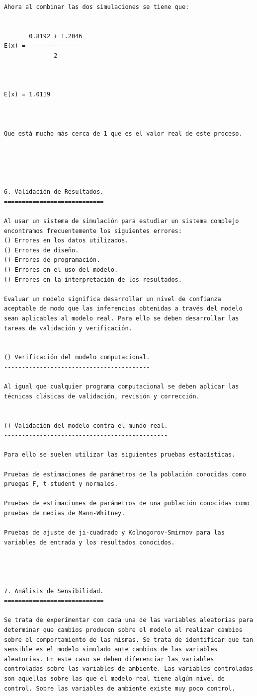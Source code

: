 \begin{verbatim}
Ahora al combinar las dos simulaciones se tiene que:


       0.8192 + 1.2046
E(x) = ---------------
              2



E(x) = 1.0119



Que está mucho más cerca de 1 que es el valor real de este proceso.





6. Validación de Resultados.
============================

Al usar un sistema de simulación para estudiar un sistema complejo encontramos frecuentemente los siguientes errores:
() Errores en los datos utilizados.
() Errores de diseño.
() Errores de programación.
() Errores en el uso del modelo.
() Errores en la interpretación de los resultados.

Evaluar un modelo significa desarrollar un nivel de confianza aceptable de modo que las inferencias obtenidas a través del modelo sean aplicables al modelo real. Para ello se deben desarrollar las tareas de validación y verificación.


() Verificación del modelo computacional.
-----------------------------------------

Al igual que cualquier programa computacional se deben aplicar las técnicas clásicas de validación, revisión y corrección.


() Validación del modelo contra el mundo real.
----------------------------------------------

Para ello se suelen utilizar las siguientes pruebas estadísticas.

Pruebas de estimaciones de parámetros de la población conocidas como pruegas F, t-student y normales.

Pruebas de estimaciones de parámetros de una población conocidas como pruebas de medias de Mann-Whitney.

Pruebas de ajuste de ji-cuadrado y Kolmogorov-Smirnov para las variables de entrada y los resultados conocidos.




7. Análisis de Sensibilidad.
============================

Se trata de experimentar con cada una de las variables aleatorias para determinar que cambios producen sobre el modelo al realizar cambios sobre el comportamiento de las mismas. Se trata de identificar que tan sensible es el modelo simulado ante cambios de las variables aleatorias. En este caso se deben diferenciar las variables controladas sobre las variables de ambiente. Las variables controladas son aquellas sobre las que el modelo real tiene algún nivel de control. Sobre las variables de ambiente existe muy poco control.




\end{verbatim}
